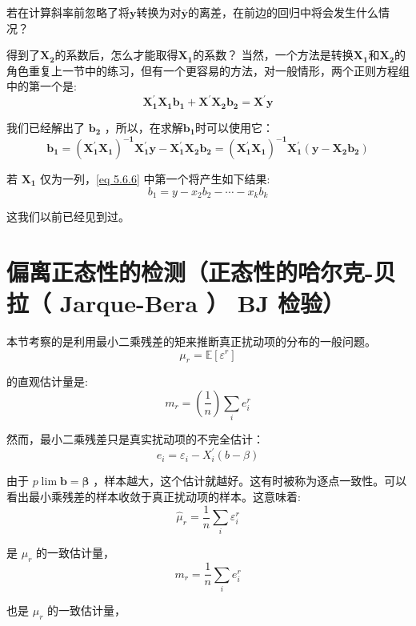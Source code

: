 \begin{myexample}[练习]
    若在计算斜率前忽略了将$ \boldsymbol{ y } $转换为对$ \boldsymbol{ \bar{y} } $的离差，在前边的回归中将会发生什么情况？

    得到了$ \boldsymbol{ X_{2} } $的系数后，怎么才能取得$ \boldsymbol{ X_{1} } $的系数？ 
    当然，一个方法是转换$ \boldsymbol{ X_{1} } $和$ \boldsymbol{ X_{2} } $的角色重复上一节中的练习，但有一个更容易的方法，对一般情形，两个正则方程组中的第一个是:
    $$ \boldsymbol{ X_{1}^{\prime} X_{1} b_{1}+X^{\prime} X_{2} b_{2}=X^{\prime} y } $$

    我们已经解出了 $ \boldsymbol{ b_{2} } $ ，所以，在求解$ \boldsymbol{ b_{1} } $时可以使用它：
    \begin{equation}
        \boldsymbol{ b_{1} = \left(X_{1}^{\prime} X_{1}\right)^{-1} X_{1}^{\prime} y-
         X_{1}^{\prime} X_{2} b_{2}=\left(X_{1}^{\prime} X_{1}\right)^{-1} X_{1}^{\prime}\left(y-X_{2} b_{2}\right) }
        \label{eq 5.6.6}
    \end{equation}

    若 $ \boldsymbol{ X_{1} } $ 仅为一列，\eqref{eq 5.6.6} 中第一个将产生如下结果:
    \begin{equation}
        b_{1}=y-x_{2} b_{2}-\cdots-x_{k} b_{k}
    \end{equation}

    这我们以前已经见到过。
\end{myexample}

\section{偏离正态性的检测（正态性的哈尔克-贝拉（ Jarque-Bera ） BJ 检验）}

本节考察的是利用最小二乘残差的矩来推断真正扰动项的分布的一般问题。
$$ \mu_{r} = \mathbb{E}\left[\varepsilon^{r}\right] $$

的直观估计量是:
$$ m_{r}=\left(\frac{1}{n}\right) \sum_{i} e_{i}^{r} $$

然而，最小二乘残差只是真实扰动项的不完全估计：
$$ e_{i}=\varepsilon_{i}-X_{i}^{\prime}(b-\beta) $$

由于 $p \lim \boldsymbol{ b } = \boldsymbol{ \beta } $ ，样本越大，这个估计就越好。这有时被称为逐点一致性。可以看出最小乘残差的样本收敛于真正扰动项的样本。这意味着:
$$ \hat{\mu}_{r}=\frac{1}{n} \sum_{i} \varepsilon_{i}^{r} $$

是 $ \mu_{r} $ 的一致估计量，
$$ m_{r}=\frac{1}{n} \sum_{i} e_{i}^{r} $$

也是 $ \mu_{r} $ 的一致估计量，

